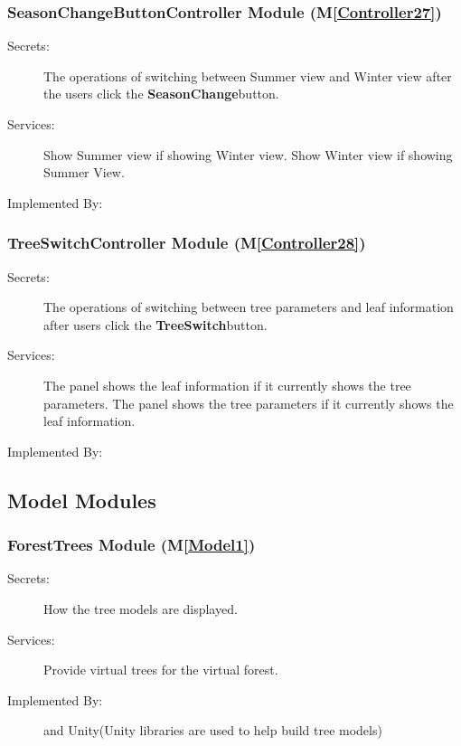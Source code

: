 \documentclass[12pt, titlepage]{article}
\newcommand{\mref}[1]{M\ref{#1}}
\begin{document}
\renewcommand{\bt}{\textbf{SeasonChange}}
\subsubsection{SeasonChangeButtonController Module (\mref{Controller27})}
\begin{description}
\item[Secrets:] The operations of switching between Summer view and Winter view after the users click the \bt button.
\item[Services:] Show Summer view if showing Winter view. Show Winter view if showing Summer View. 
\item[Implemented By:] \progname{}
\end{description}

\renewcommand{\bt}{\textbf{TreeSwitch}}
\subsubsection{TreeSwitchController Module (\mref{Controller28})}
\begin{description}
\item[Secrets:] The operations of switching between tree parameters and leaf information after users click the \bt button.
\item[Services:] The panel shows the leaf information if it currently shows the tree parameters. The panel shows the tree parameters if it currently shows the leaf information.
\item[Implemented By:] \progname{}
\end{description}

\subsection{Model Modules}

\subsubsection{ForestTrees Module (\mref{Model1})}
\begin{description}
\item[Secrets:] How the tree models are displayed.
\item[Services:] Provide virtual trees for the virtual forest.
\item[Implemented By:] \progname{} and Unity(Unity libraries are used to help build tree
models)
\end{description}
\end{document}
